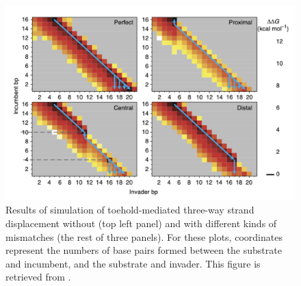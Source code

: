 \documentclass{article}
\begin{document}
\begin{figure}[h]
	\centering
	\vspace*{0.3cm}
	\includegraphics[scale=0.6]{latexplots/Machinek.png}\hspace*{1cm}
	\caption{Results of simulation of toehold-mediated three-way strand displacement without (top left panel) and with different kinds of mismatches (the rest of three panels). For these plots, coordinates represent the numbers of base pairs formed between the substrate and incumbent, and the substrate and invader. This figure is retrieved from \cite{MachinekThreeway}.}
	\vspace*{-.3cm}
	\label{fig:PElandscape}
\end{figure}


%
\end{document}
